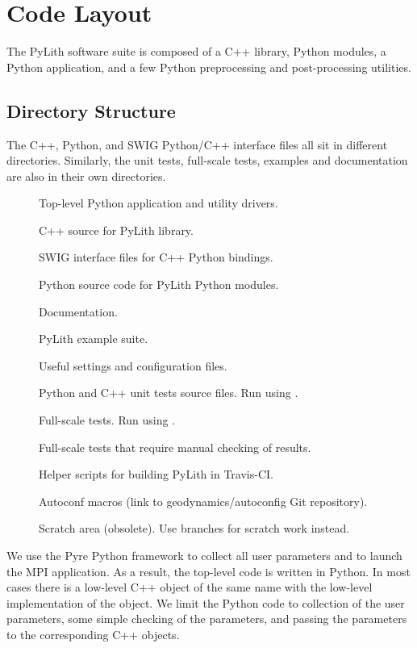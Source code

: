 \section{Code Layout}
\label{sec:code:layout}

The PyLith software suite is composed of a C++ library, Python
modules, a Python application, and a few Python preprocessing and
post-processing utilities.

\subsection{Directory Structure}

The C++, Python, and SWIG Python/C++ interface files all sit in
different directories. Similarly, the unit tests, full-scale tests,
examples and documentation are also in their own directories.

\begin{description}
\item[] Top-level Python application and
  utility drivers.
\item[] C++ source for PyLith library.
\item[] SWIG interface files for C++ Python
  bindings.
\item[] Python source code for PyLith Python modules.
\item[] Documentation.
\item[] PyLith example suite.
\item[] Useful settings and configuration files.
\item[] Python and C++ unit tests source
  files. Run using .
\item[] Full-scale tests. Run using
  .
\item[] Full-scale tests that require manual checking
  of results.
\item[] Helper scripts for building PyLith in
  Travis-CI.
\item[] Autoconf macros (link to
  geodynamics/autoconfig Git repository).
\item[] Scratch area (obsolete). Use branches for
  scratch work instead.
\end{description}

We use the Pyre Python framework to collect all user parameters and to
launch the MPI application. As a result, the top-level code is written
in Python. In most cases there is a low-level C++ object of the same
name with the low-level implementation of the object. We limit the
Python code to collection of the user parameters, some simple
checking of the parameters, and passing the parameters to the
corresponding C++ objects.

